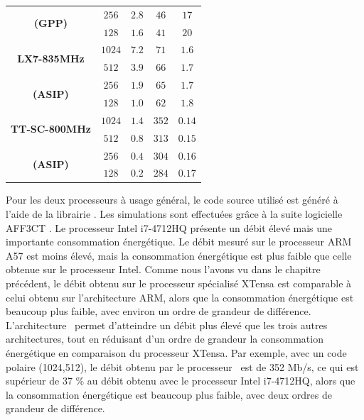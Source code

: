 \begin{table}
\begin{tabular}{ccccc}
     \multirow{2}{*}{\bf (GPP)}                 & $256$    & $2.8$  & $46$  & $17$ \\

                                                & $128$    & $1.6$  & $41$  & $20$ \\

    \midrule

    \multirow{2}{*}{\bf LX7-835MHz}             & $1024$   & $7.2$  & $71$  & $1.6$ \\

                                                & $512$    & $3.9$  & $66$  & $1.7$ \\

     \multirow{2}{*}{\bf (ASIP)}                & $256$    & $1.9$  & $65$  & $1.7$ \\

                                                & $128$    & $1.0$  & $62$  & $1.8$ \\

    \midrule

    \multirow{2}{*}{\bf TT-SC-800MHz}            & $1024$  & $1.4$   & $352$ & $0.14$   \\ %

                                                & $512$    & $0.8$  & $313$ & $0.15$   \\ %

     \multirow{2}{*}{\bf (ASIP)}                & $256$    & $0.4$  & $304$ & $0.16$   \\ %

                                                & $128$    & $0.2$  & $284$ & $0.17$   \\ %

    \bottomrule
  \end{tabular}
\end{table}

Pour les deux processeurs à usage général, le code source utilisé est généré à l'aide de la librairie \cite{cassagne_efficient_2015}. Les simulations sont effectuées grâce à la suite logicielle AFF3CT \cite{aff3ct_aff3ct:_2016}. Le processeur Intel i7-4712HQ présente un débit élevé mais une importante consommation énergétique. Le débit mesuré sur le processeur ARM A57 est moins élevé, mais la consommation énergétique est plus faible que celle obtenue sur le processeur Intel. Comme nous l'avons vu dans le chapitre précédent, le débit obtenu sur le processeur spécialisé XTensa est comparable à celui obtenu sur l'architecture ARM, alors que la consommation énergétique est beaucoup plus faible, avec environ un ordre de grandeur de différence. L'architecture \TTSC~permet d'atteindre un débit plus élevé que les trois autres architectures, tout en réduisant d'un ordre de grandeur la consommation énergétique en comparaison du processeur XTensa. Par exemple, avec un code polaire (1024,512), le débit obtenu par le processeur \TTSC~est de 352 Mb/s, ce qui est supérieur de 37 \% au débit obtenu avec le processeur Intel i7-4712HQ, alors que la consommation énergétique est beaucoup plus faible, avec deux ordres de grandeur de différence.

